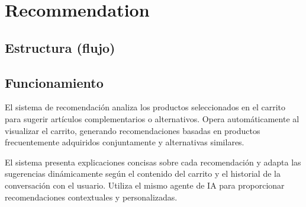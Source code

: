 \section{Recommendation}

\subsection{Estructura (flujo)}


\subsection{Funcionamiento}

El sistema de recomendación analiza los productos seleccionados en el carrito para sugerir artículos complementarios o alternativos. Opera automáticamente al visualizar el carrito, generando recomendaciones basadas en productos frecuentemente adquiridos conjuntamente y alternativas similares.

El sistema presenta explicaciones concisas sobre cada recomendación y adapta las sugerencias dinámicamente según el contenido del carrito y el historial de la conversación con el usuario. Utiliza el mismo agente de IA para proporcionar recomendaciones contextuales y personalizadas.
